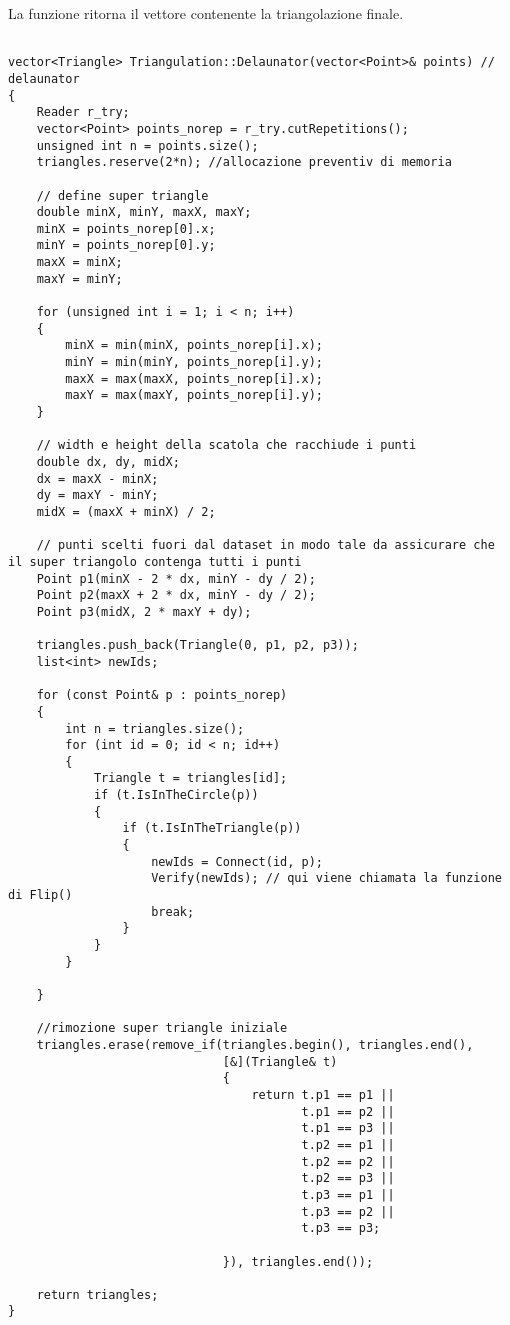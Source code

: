 \documentclass{article}
\begin{document}
\noindent La funzione ritorna il vettore contenente la triangolazione finale.

\begin{lstlisting}

vector<Triangle> Triangulation::Delaunator(vector<Point>& points) // delaunator
{
	Reader r_try;
    vector<Point> points_norep = r_try.cutRepetitions();
    unsigned int n = points.size();
    triangles.reserve(2*n); //allocazione preventiv di memoria

    // define super triangle
    double minX, minY, maxX, maxY;
    minX = points_norep[0].x;
    minY = points_norep[0].y;
    maxX = minX;
    maxY = minY;

    for (unsigned int i = 1; i < n; i++)
    {
        minX = min(minX, points_norep[i].x);
        minY = min(minY, points_norep[i].y);
        maxX = max(maxX, points_norep[i].x);
        maxY = max(maxY, points_norep[i].y);
    }

    // width e height della scatola che racchiude i punti
    double dx, dy, midX;
    dx = maxX - minX;
    dy = maxY - minY;
    midX = (maxX + minX) / 2;

    // punti scelti fuori dal dataset in modo tale da assicurare che il super triangolo contenga tutti i punti
    Point p1(minX - 2 * dx, minY - dy / 2);
    Point p2(maxX + 2 * dx, minY - dy / 2);
    Point p3(midX, 2 * maxY + dy);
   
    triangles.push_back(Triangle(0, p1, p2, p3));
    list<int> newIds;

    for (const Point& p : points_norep)
    {
        int n = triangles.size();
        for (int id = 0; id < n; id++)
        {
            Triangle t = triangles[id];
            if (t.IsInTheCircle(p))
            {
                if (t.IsInTheTriangle(p))
                {
                    newIds = Connect(id, p);
                    Verify(newIds); // qui viene chiamata la funzione di Flip()
                    break;
                }
            }
        }

    }

    //rimozione super triangle iniziale
    triangles.erase(remove_if(triangles.begin(), triangles.end(),
                              [&](Triangle& t)
                              {
                                  return t.p1 == p1 ||
                                         t.p1 == p2 ||
                                         t.p1 == p3 ||
                                         t.p2 == p1 ||
                                         t.p2 == p2 ||
                                         t.p2 == p3 ||
                                         t.p3 == p1 ||
                                         t.p3 == p2 ||
                                         t.p3 == p3;

                              }), triangles.end());

    return triangles;
}
\end{lstlisting}
\end{document}
